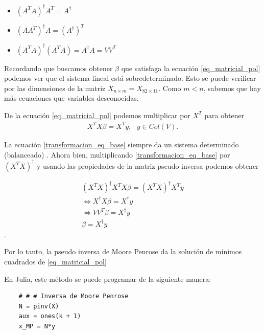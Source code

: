 \begin{itemize}
    \item $(A^{T}A)^{\dagger} A^{T} = A^{\dagger}$
    \item $(AA^{T})^{\dagger} A = (A^{\dagger})^{T}$
    \item $(A^{T}A)^{\dagger}(A^{T}A) = A^{\dagger}A = VV^{T}$
\end{itemize}


Recordando que buscamos obtener $\beta$ que satisfaga la ecuación \ref{eq_matricial_pol} podemos ver que el sistema lineal está sobredeterminado. Esto se puede verificar por las dimensiones de la matriz $X_{n \times m} = X_{82 \times 11}$. Como $m < n$, sabemos que hay más ecuaciones que variables desconocidas. 


De la ecuación \ref{eq_matricial_pol} podemos multiplicar por $X^{T}$ para obtener
\begin{equation}
\label{transformacion_eq_base}
    \begin{aligned}
    X^{T}X \beta = X^{T} y, \text{ } y \in Col(V).
    \end{aligned}
\end{equation}

La ecuación \ref{transformacion_eq_base} siempre da un sistema determinado (balanceado) \cite{worldScientificNews}. Ahora bien, multiplicando \ref{transformacion_eq_base} por $(X^{T}X)^{\dagger}$ y usando las propiedades de la matriz pseudo inversa podemos obtener 


\begin{equation*}
    \begin{aligned}
    (X^{T}X)^{\dagger} X^{T}X \beta = (X^{T}X)^{\dagger} X^{T} y \\
    \iff X^{\dagger} X \beta = X^{\dagger} y \\
    \iff V V^{T} \beta = X^{\dagger} y \\
    \beta = X^{\dagger} y 
    \end{aligned}
\end{equation*}. 

Por lo tanto, la pseudo inversa de Moore Penrose da la solución de mínimos cuadrados de \ref{eq_matricial_pol} \cite{worldScientificNews}


En Julia, este método se puede programar de la siguiente manera:

\begin{verbatim}
    # # # Inversa de Moore Penrose
    N = pinv(X)
    aux = ones(k + 1)
    x_MP = N*y 
\end{verbatim}

